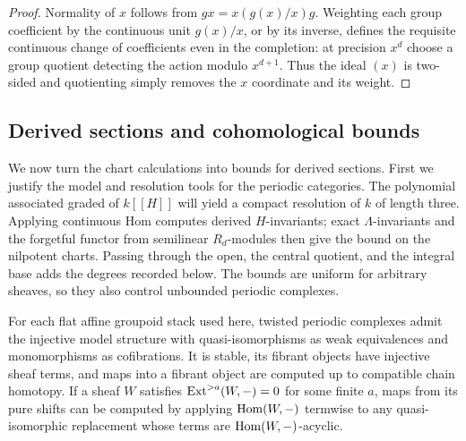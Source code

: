 \begin{proof}
Normality of $x$ follows from
$g x=x(g(x)/x)g$.  Weighting each group coefficient by the continuous
unit $g(x)/x$, or by its inverse, defines the requisite continuous
change of coefficients even in the completion: at precision $x^d$
choose a group quotient detecting the action modulo $x^{d+1}$.
Thus the ideal $(x)$ is two-sided and quotienting simply removes
the $x$ coordinate and its weight.
\end{proof}

\subsection{Derived sections and cohomological bounds}

We now turn the chart calculations into bounds for derived sections.
First we justify the model and resolution tools for the periodic
categories.  The polynomial associated graded of $k[[H]]$ will yield
a compact resolution of $k$ of length three.  Applying continuous Hom
computes derived $H$-invariants; exact $\Lambda$-invariants and the
forgetful functor from semilinear $R_d$-modules then give the bound on
the nilpotent charts.  Passing through the open, the central quotient,
and the integral base adds the degrees recorded below.  The bounds are
uniform for arbitrary sheaves, so they also control unbounded periodic
complexes.

\begin{lemma}\label{geom:injective-model}
For each flat affine groupoid stack used here, twisted periodic
complexes admit the injective model structure with quasi-isomorphisms
as weak equivalences and monomorphisms as cofibrations.  It is stable,
its fibrant objects have injective sheaf terms, and maps into a
fibrant object are computed up to compatible chain homotopy.
If a sheaf $W$ satisfies $\operatorname{Ext}^{>a}(W,-)=0$ for some finite $a$, maps
from its pure shifts can be computed by applying $\operatorname{Hom}(W,-)$
termwise to any quasi-isomorphic replacement whose terms are
$\operatorname{Hom}(W,-)$-acyclic.
\end{lemma}

